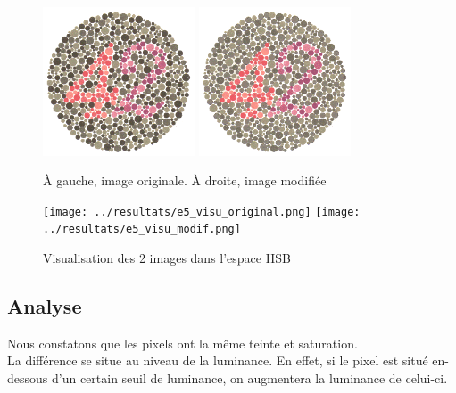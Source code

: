 \documentclass[a4paper]{article}
\begin{document}
\begin{figure}[H]
\begin{center}
\includegraphics[width=170px]{../base/cas_1_dalton42.png}
\includegraphics[width=170px]{../base/cas_1_dalton42-question5.png}
\end{center}
\caption{À gauche, image originale. À droite, image modifiée}
\end{figure}

\begin{figure}[H]
\begin{center}
\texttt{[image: ../resultats/e5\_visu\_original.png]}
\texttt{[image: ../resultats/e5\_visu\_modif.png]}
\end{center}
\caption{Visualisation des 2 images dans l'espace HSB}
\end{figure}

\clearpage
\subsection{Analyse}

Nous constatons que les pixels ont la même teinte et saturation.\\
La différence se situe au niveau de la luminance. En effet, si le pixel est situé en-dessous d'un certain seuil de luminance, on augmentera la luminance de celui-ci.

\clearpage

\end{document}
